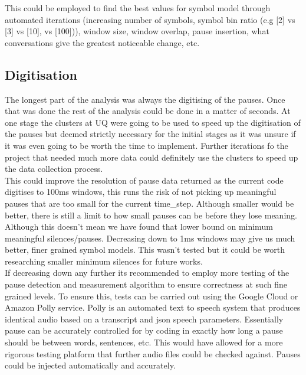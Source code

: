 This could be employed to find the best values for symbol model through automated iterations (increasing number of symbols, symbol bin ratio (e.g [2] vs [3] vs [10], vs [100])), window size, window overlap, pause insertion, what conversations give the greatest noticeable change, etc.

%
%

\subsection{Digitisation}
The longest part of the analysis was always the digitising of the pauses. Once that was done the rest of the analysis could be done in a matter of seconds. At one stage the clusters at UQ were going to be used to speed up the digitisation of the pauses but deemed strictly necessary for the initial stages as it was unsure if it was even going to be worth the time to implement. Further iterations fo the project that needed much more data could definitely use the clusters to speed up the data collection process. \\

This could improve the resolution of pause data returned as the current code digitises to 100ms windows, this runs the risk of not picking up meaningful pauses that are too small for the current time\_step. Although smaller would be better, there is still a limit to how small pauses can be before they lose meaning. Although this doesn't mean we have found that lower bound on minimum meaningful silences/pauses. Decreasing down to 1ms windows may give us much better, finer grained symbol models. This wasn't tested but it could be worth researching smaller minimum silences for future works.\\

If decreasing down any further its recommended to employ more testing of the pause detection and measurement algorithm to ensure correctness at such fine grained levels. To ensure this, tests can be carried out using the Google Cloud or Amazon Polly service. Polly is an automated text to speech system that produces identical audio based on a transcript and json speech parameters. Essentially pause can be accurately controlled for by coding in exactly how long a pause should be between words, sentences, etc. This would have allowed for a more rigorous testing platform that further audio files could be checked against. Pauses could be injected automatically and accurately. \\

